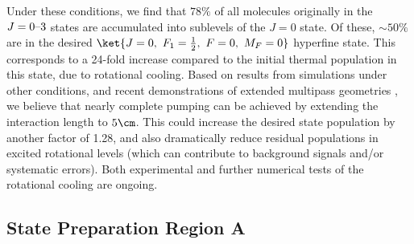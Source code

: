 Under these conditions, we find that $78\%$ of all molecules originally in the $J=\hbox{0--3}$ states are accumulated into sublevels of the $J=0$ state. Of these, $\sim 50\%$ are in the desired $\ket{J=0,~F_1=\frac{1}{2},~F=0,~M_F=0}$ hyperfine state. This corresponds to a 24-fold increase compared to the initial thermal population in this state, due to rotational cooling. Based on results from simulations under other conditions, and recent demonstrations of extended multipass geometries \cite{privateHunter2019}, we believe that nearly complete pumping can be achieved by extending the interaction length to $5 \cm$. This could increase the desired state population by another factor of 1.28, and also dramatically reduce residual populations in excited rotational levels (which can contribute to background signals and/or systematic errors). Both experimental and further numerical tests of the rotational cooling are ongoing.

\subsection{State Preparation Region A}
\label{sec:state_preparation_region_a}

